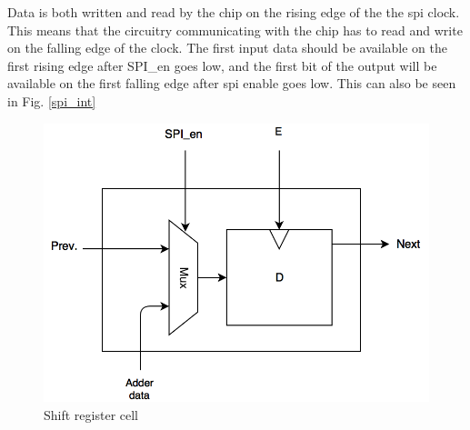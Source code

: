 Data is both written and read by the chip on the rising edge of the the spi clock. This means that the circuitry communicating with the chip has to read and write on the falling edge of the clock. The first input data should be available on the first rising edge after SPI_en goes low, and the first bit of the output will be available on the first falling edge after spi enable goes low. This can also be seen in Fig. \ref{spi_int}

\begin{figure}[H]
\centering
\captionsetup{justification=centering}
\includegraphics[scale=0.35]{../figures/MUX_DFF.png}
\caption{Shift register cell}
\label{mux_dff}
\end{figure}